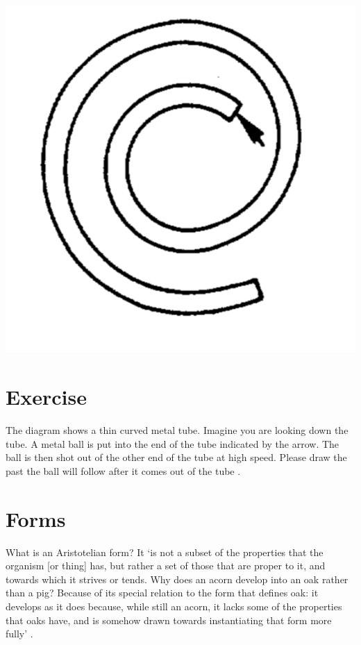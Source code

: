 \documentclass[12pt]{extarticle}
\begin{document}
\begin{multicols*}{3}
\begin{center}
\includegraphics[scale=0.3]{img/mccloskey_1980_fig1b.png}
\end{center}
\section{Exercise}
The diagram shows a thin curved metal tube.
Imagine you are looking down the tube.
A metal ball is put into the end of the tube indicated by the arrow.
The ball is then shot out of the other end of the tube at high speed.
Please draw the past the ball will follow after it comes out of the tube \citep{mccloskey:1980_curvilinear}.
 
\section{Forms}
What is an Aristotelian form?
It ‘is not a subset of the properties that the organism [or thing] has, but rather a set of those that are 
proper to it, and towards which it strives or tends. Why does an acorn develop into an oak rather than 
a pig? Because of its special relation to the form that defines oak: it develops as it does because, 
while still an acorn, it lacks some of the properties that oaks have, and is somehow drawn towards 
instantiating that form more fully’ \citep[p.~10]{bennett:2003_learning}.
 

\end{multicols*}
\end{document}
